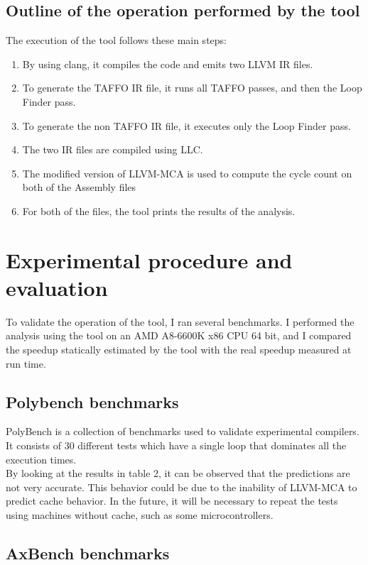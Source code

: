 \subsection{Outline of the operation performed by the tool}
The execution of the tool follows these main steps:
\begin{enumerate}
\item By using clang, it compiles the code and emits two LLVM IR files.
\item To generate the TAFFO IR file, it runs all TAFFO passes, and then the Loop Finder pass.
\item To generate the non TAFFO IR file, it executes only the Loop Finder pass.
\item The two IR files are compiled using LLC.
\item The modified version of LLVM-MCA is used to compute the cycle count on both of the Assembly files
\item For both of the files, the tool prints the results of the analysis.
\end{enumerate}

\section{Experimental procedure and evaluation}
To validate the operation of the tool, I ran several benchmarks.
I performed the analysis using the tool on an AMD A8-6600K x86 CPU 64 bit, and I compared the speedup statically estimated by the tool with the real speedup measured at run time.

\subsection{Polybench benchmarks}
PolyBench is a collection of benchmarks used to validate experimental compilers. It consists of 30 different tests which have a single loop that dominates all the execution times. \\
By looking at the results in table 2, it can be observed that the predictions are not very accurate.
This behavior could be due to the inability of LLVM-MCA to predict cache behavior.
In the future, it will be necessary to repeat the tests using machines without cache, such as some microcontrollers.


\subsection{AxBench benchmarks}

